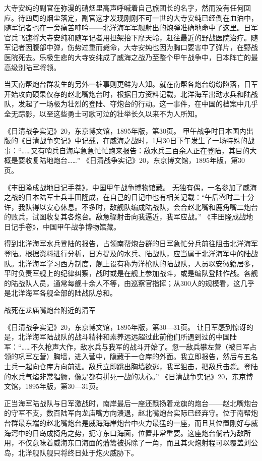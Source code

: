 \documentclass[12pt,UTF8]{ctexbook}
\begin{document}
大寺安纯的副官在弥漫的硝烟里高声呼喊着自己旅团长的名字，然而没有任何回应。待四周的烟尘落定，副官这才发现刚刚不可一世的大寺安纯已经倒在血泊中，随军记者也在一旁痛苦呻吟——北洋海军军舰射出的炮弹准确地命中了这里。日军官兵飞速将大寺安纯和随军记者用担架抬下摩天岭，赶往最近的野战医院治疗。随军记者因腹部中弹，伤势过重而毙命，大寺安纯也因为胸口要害中了弹片，在野战医院死去。乐极生悲的大寺安纯成了威海之战乃至整个甲午战争中，日本阵亡的最高级别陆军将领。

当天南帮炮台群发生的另外一桩事则更鲜为人知。就在南帮各炮台纷纷陷落，日军开始攻向硕果仅存的赵北嘴炮台时，根据日方资料记载，北洋海军出动水兵和陆战队，发起了一场极为壮烈的登陆、夺炮台的行动。这一事件，在中国的档案中几乎全无踪影，以至这些勇士可歌可泣的壮举长久以来不为人所知。

《日清战争实记》20，东京博文馆，1895年版，第30页。
甲午战争时日本国内出版的《日清战争实记》中记载，在威海之战时，1月30日下午发生了一场特殊的战事：“……又有哨兵自海岸急急忙忙跑来报告：敌水兵三百余人正在登陆，其目的大概是要收复陆地炮台……” 《日清战争实记》20，东京博文馆，1895年版，第30页。

《丰田隆成战地日记手卷》，中国甲午战争博物馆藏。
无独有偶，一名参加了威海之战的日本陆军士兵丰田隆成，在自己的日记中也有相关记载：“午后零时二十分许，我队得以安心休息。不多时，敌舰队编成陆战队，会合赵北嘴和鹿角嘴二炮台的败兵，试图收复其各炮台。敌急骤射击向我逼近，我军应战。” 《丰田隆成战地日记手卷》，中国甲午战争博物馆藏。

得到北洋海军水兵登陆的报告，占领南帮炮台群的日军急忙分兵前往阻击北洋海军登陆。根据资料进行分析，日方提及的水兵、陆战队，应当属于北洋海军中的陆战队。北洋海军学习西方制度，舰上设有称为洋枪队的陆战队，人员以安徽籍居多，平时负责军舰上的纪律纠察，战时或是在舰上参加战斗，或是编队登陆作战。各舰的陆战队人员，通常每舰十余人不等，由巡察官指挥；从300人的规模看，这几乎是北洋海军各舰全部的陆战队总和。


战死在龙庙嘴炮台附近的清军

《日清战争实记》20，东京博文馆，1895年版，第30—31页。
让日军感到惊讶的是，北洋海军陆战队的战斗精神和素养远远超过此前他们所遇到过的中国陆军：“……不久枪声大作，敌水兵与我军的战斗开始了。忽一敌兵攀左营（被日军占领的巩军左营）胸墙，进入营中，隐藏于一仓库的外面。我立即报告，然后与五名士兵一起向仓库方向前进。敌兵立即跳出胸墙欲逃，我军狙击，把敌兵击毙。登陆的水兵气焰非常猖獗，像是都有拼死一战的决心。” 《日清战争实记》20，东京博文馆，1895年版，第30—31页。

正当海军陆战队与日军激战时，南岸最后一座还飘扬着龙旗的炮台——赵北嘴炮台的守军不支，数百陆军向龙庙嘴方向溃退，赵北嘴炮台实际已经弃守。位于南帮炮台群最东端的赵北嘴炮台是威海海岸炮台中火力最猛的一座，而且其位置刚好与威海湾中的日岛成掎角之势，扼守东口海面，位置非常重要。这座炮台倘若为敌所用，不仅意味着威海东口海面的藩篱被拆除了一角，而且其火炮射程可以覆盖刘公岛，北洋舰队舰只将终日处于炮火威胁下。
\end{document}
